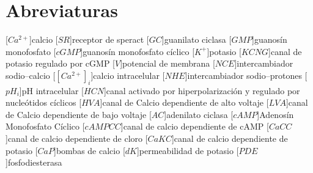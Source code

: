     \chapter*{Abreviaturas}
    \begin{acronym}[hcn]
        [$Ca^{2+}$]{calcio}
        [$SR$]{receptor de speract}
        [$GC$]{guanilato ciclasa}
        [$GMP$]{guanosín monofosfato}
        [$cGMP$]{guanosín monofosfato cíclico}
        [$K^+$]{potasio}
        [$KCNG$]{canal de potasio regulado por cGMP}
        [$V$]{potencial de membrana}
        [$NCE$]{intercambiador sodio–calcio}
        [\ensuremath{\left[Ca^{2+}\right]_i}]{calcio intracelular}
        [$NHE$]{intercambiador sodio–protones}
        [$pH_i$]{pH intracelular} %
        [$HCN$]{canal activado por hiperpolarización y regulado por nucleótidos cíclicos}
        [$HVA$]{canal de Calcio dependiente de alto voltaje}
        [$LVA$]{canal de Calcio dependiente de bajo voltaje}
        [$AC$]{adenilato ciclasa}
        [$cAMP$]{Adenosín Monofosfato Cíclico}
        [$cAMPCC$]{canal de calcio dependiente de cAMP}
        [$CaCC$]{canal de calcio dependiente de cloro}
        [$CaKC$]{canal de calcio dependiente de potasio}
        [$CaP$]{bombas de calcio}
        [$dK$]{permeabilidad de potasio}
        [$PDE$]{fosfodiesterasa}
    \end{acronym}                     
\endgroup

\cleardoublepage